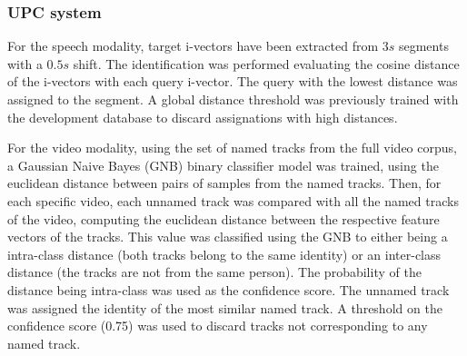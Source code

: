 \subsubsection{UPC system}

For the speech modality, target i-vectors have been extracted from $3s$ segments with a $0.5s$ shift. The identification was performed evaluating the cosine distance of the i-vectors with each query i-vector. The query with the lowest distance was assigned to the segment. A global distance threshold was previously trained with the development database to discard assignations with high distances.

For the video modality, using the set of named tracks from the full video corpus, a Gaussian Naive Bayes (GNB) binary classifier model was trained, using the euclidean distance between pairs of samples from the named tracks. Then, for each specific video, each unnamed track was compared with all the named tracks of the video, computing the euclidean distance between the respective feature vectors of the tracks. This value was classified using the GNB to either being a intra-class distance (both tracks belong to the same identity) or an inter-class distance (the tracks are not from the same person). The probability of the distance being intra-class was used as the confidence score. The unnamed track was assigned the identity of the most similar named track. A threshold on the confidence score (0.75) was used to discard tracks not corresponding to any named track.

\endinput
